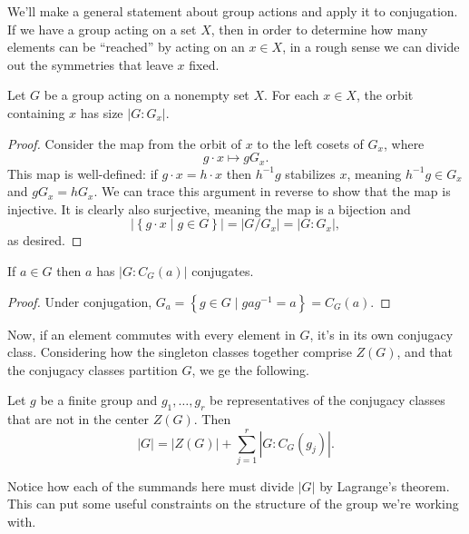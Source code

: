 \documentclass[../m171main.tex]{subfiles}
\begin{document}

We'll make a general statement about group actions and apply it to conjugation.
If we have a group acting on a set $X$, then in order to determine how many elements can be ``reached'' by acting on an $x \in X$, in a rough sense we can divide out the symmetries that leave $x$ fixed.

\begin{theorem}
    Let $G$ be a group acting on a nonempty set $X$.
    For each $x \in X$, the orbit containing $x$ has size $|G : G_x|$.
\end{theorem}

\begin{proof}
    Consider the map from the orbit of $x$ to the left cosets of $G_x$, where
    \[ g \cdot x \mapsto g G_x. \]
    This map is well-defined: if $g \cdot x = h \cdot x$ then $h^{-1}g$ stabilizes $x$, meaning $h^{-1} g \in G_x$ and $gG_x = hG_x$.
    We can trace this argument in reverse to show that the map is injective.
    It is clearly also surjective, meaning the map is a bijection and
    \[ \big| \left\{ g \cdot x \;|\; g \in G \right\} \big| = |G / G_x| = |G : G_x|, \]
    as desired.
\end{proof}

\begin{corollary}[]
    If $a \in G$ then $a$ has $|G : C_G(a)|$ conjugates.
\end{corollary}

\begin{proof}
    Under conjugation, $G_a = \left\{ g \in G \;|\; gag^{-1} = a \right\} = C_G(a)$.
\end{proof}

Now, if an element commutes with every element in $G$, it's in its own conjugacy class.
Considering how the singleton classes together comprise $Z(G)$, and that the conjugacy classes partition $G$, we ge the following.

\pagebreak

\begin{theorem}
    Let $g$ be a finite group and $g_1, \ldots, g_r$ be representatives of the conjugacy classes that are not in the center $Z(G)$.
    Then
    \[ |G| = |Z(G)| + \sum_{j=1}^{r} | G : C_G(g_j) |. \]
\end{theorem}

Notice how each of the summands here must divide $|G|$ by Lagrange's theorem.
This can put some useful constraints on the structure of the group we're working with.
\end{document}
